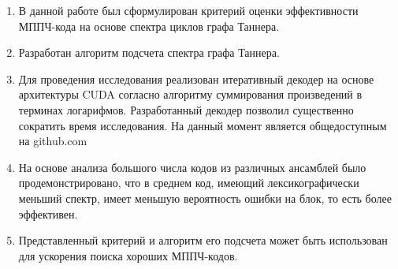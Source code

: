 \startconclusionpage

\begin{enumerate}
	\item В данной работе был сформулирован критерий оценки эффективности МППЧ-кода на основе спектра циклов графа Таннера.
	\item Разработан алгоритм подсчета спектра графа Таннера.
	\item  Для проведения исследования реализован итеративный декодер на основе архитектуры CUDA согласно алгоритму суммирования произведений в терминах логарифмов. Разработанный декодер позволил существенно сократить время исследования. На данный момент является общедоступным на github.com
	\item На основе анализа большого числа кодов из различных ансамблей было продемонстрировано, что в среднем код, имеющий лексикографически меньший спектр, имеет меньшую вероятность ошибки на блок, то есть более эффективен.
	\item Представленный критерий и алгоритм его подсчета может быть использован для ускорения поиска хороших МППЧ-кодов.
\end{enumerate}


 
